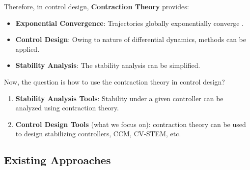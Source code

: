 \begin{frame}{\insertsubsectionhead}{}

  Therefore, in control design, \textbf{Contraction Theory} provides:
  \begin{itemize}
    \item <2-> \textbf{Exponential Convergence}: Trajectories globally exponentially converge .
    \item <3-> \textbf{Control Design}: Owing to nature of differential dynamics,  methods can be applied.
    \item <4-> \textbf{Stability Analysis}: The stability analysis can be simplified.
  \end{itemize}

  \vspace{1em}

  {
  Now, the question is how to use the contraction theory in control design?
  \begin{enumerate}
    \item \textbf{Stability Analysis Tools}: Stability under a given controller can be analyzed using contraction theory.
    \item \textbf{Control Design Tools} (what we focus on): contraction theory can be used to design stabilizing controllers, \eg CCM, CV-STEM, etc. 
  \end{enumerate}
  }

\end{frame}

\subsection{Existing Approaches}


